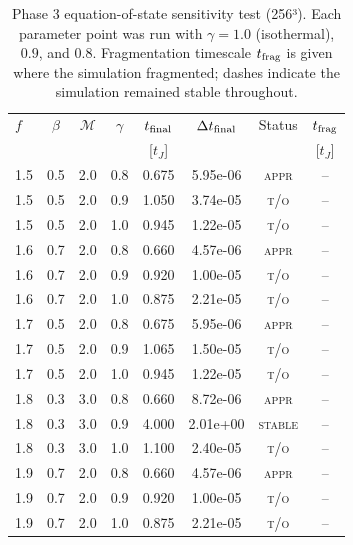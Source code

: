 \begin{table}
\centering
\caption{Phase 3 equation-of-state sensitivity test (256³). Each parameter
  point was run with $\gamma = 1.0$ (isothermal), $0.9$, and $0.8$.
  Fragmentation timescale $t_{\rm frag}$ is given where the simulation
  fragmented; dashes indicate the simulation remained stable throughout.}
\label{tab:phase3_eos}
\begin{tabular}{lccccccc}
\hline
$f$ & $\beta$ & $\mathcal{M}$ & $\gamma$ & $t_{\rm final}$ & $\Delta t_{\rm final}$ & Status & $t_{\rm frag}$ \\
 & & & & [$t_J$] & & & [$t_J$] \\
\hline
  1.5 & 0.5 & 2.0 & 0.8 & 0.675 & 5.95e-06 & \textsc{appr} & -- \\
  1.5 & 0.5 & 2.0 & 0.9 & 1.050 & 3.74e-05 & \textsc{t/o} & -- \\
  1.5 & 0.5 & 2.0 & 1.0 & 0.945 & 1.22e-05 & \textsc{t/o} & -- \\
  1.6 & 0.7 & 2.0 & 0.8 & 0.660 & 4.57e-06 & \textsc{appr} & -- \\
  1.6 & 0.7 & 2.0 & 0.9 & 0.920 & 1.00e-05 & \textsc{t/o} & -- \\
  1.6 & 0.7 & 2.0 & 1.0 & 0.875 & 2.21e-05 & \textsc{t/o} & -- \\
  1.7 & 0.5 & 2.0 & 0.8 & 0.675 & 5.95e-06 & \textsc{appr} & -- \\
  1.7 & 0.5 & 2.0 & 0.9 & 1.065 & 1.50e-05 & \textsc{t/o} & -- \\
  1.7 & 0.5 & 2.0 & 1.0 & 0.945 & 1.22e-05 & \textsc{t/o} & -- \\
  1.8 & 0.3 & 3.0 & 0.8 & 0.660 & 8.72e-06 & \textsc{appr} & -- \\
  1.8 & 0.3 & 3.0 & 0.9 & 4.000 & 2.01e+00 & \textsc{stable} & -- \\
  1.8 & 0.3 & 3.0 & 1.0 & 1.100 & 2.40e-05 & \textsc{t/o} & -- \\
  1.9 & 0.7 & 2.0 & 0.8 & 0.660 & 4.57e-06 & \textsc{appr} & -- \\
  1.9 & 0.7 & 2.0 & 0.9 & 0.920 & 1.00e-05 & \textsc{t/o} & -- \\
  1.9 & 0.7 & 2.0 & 1.0 & 0.875 & 2.21e-05 & \textsc{t/o} & -- \\
\hline
\end{tabular}
\end{table}
